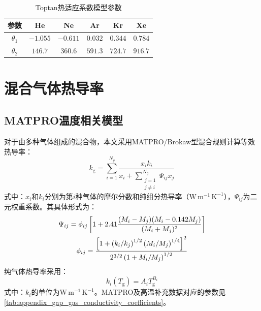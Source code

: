 \begin{table}[htbp]
	\centering
	\caption{Toptan热适应系数模型参数\cite{toptanModelingGapConductance2020}}
	\label{tab:appendix_gap_toptan_accommodation_parameters}
	
	\begin{tabular*}{\textwidth}{
			@{\extracolsep{\fill}}
			cccccc
			@{}
		}
		\toprule
		参数 & He & Ne & Ar & Kr & Xe \\
		\midrule
		$\theta_1$ & $-1.055$ & $-0.611$ & $0.032$ & $0.344$ & $0.784$ \\
		$\theta_2$ & $146.7$ & $360.6$ & $591.3$ & $724.7$ & $916.7$ \\
		\bottomrule
	\end{tabular*}
\end{table}

\section{混合气体热导率}

\subsection{MATPRO温度相关模型}
\label{app:gap_default_gas_conductivity}

对于由多种气体组成的混合物，本文采用MATPRO/Brokaw型混合规则计算等效热导率：
\begin{equation}
	k_{\mathrm g}
	=\sum_{i=1}^{N_g}
	\frac{x_i k_i}
	{x_i+\displaystyle\sum_{\substack{j=1\\j\ne i}}^{N_g}
		\Psi_{ij}x_j}
	\label{eq:appendix_gap_gas_mixture_conductivity}
\end{equation}
\noindent 式中：$x_i$和$k_i$分别为第$i$种气体的摩尔分数和纯组分热导率（$\mathrm{W\,m^{-1}\,K^{-1}}$），$\Psi_{ij}$为二元权重系数。其具体形式为\cite{brokawApproximateFormulasViscosity1958,hagrmanSCDAPRELAP5MOD1995}：
\begin{gather}
	\Psi_{ij}
	=\phi_{ij}
	\left[
	1+2.41
	\frac{(M_i-M_j)(M_i-0.142M_j)}{(M_i+M_j)^2}
	\right]
	\notag
	\\
	\phi_{ij}
	=\frac{
		\left[
		1+\left(k_i/k_j\right)^{1/2}
		\left(M_i/M_j\right)^{1/4}
		\right]^2}
	{2^{3/2}\left(1+M_i/M_j\right)^{1/2}}
	\label{eq:appendix_gap_brokaw_weights}
\end{gather}
纯气体热导率采用：
\begin{equation}
	k_i(T_{\mathrm g})=A_iT_{\mathrm g}^{B_i}
	\label{eq:appendix_gap_pure_gas_conductivity}
\end{equation}
\noindent 式中：$k_i$的单位为$\mathrm{W\,m^{-1}\,K^{-1}}$。MATPRO及高温补充数据对应的参数见\tablename\ref{tab:appendix_gap_gas_conductivity_coefficients}\cite{hagrmanSCDAPRELAP5MOD1995,springerThermalConductivityNeon1973}。

